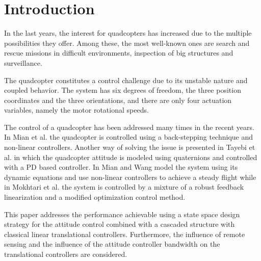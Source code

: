 \section{Introduction}
In the last years, the interest for quadcopters has increased due to the multiple possibilities they offer. Among these, the most well-known ones are search and rescue missions in difficult environments, inspection of big structures and surveillance. \nolinebreak\cite{droneuses}

The quadcopter constitutes a control challenge due to its unstable nature and coupled behavior. The system has six degrees of freedom, the three position coordinates and the three orientations, and there are only four actuation variables, namely the motor rotational speeds. \cite{draganflyer}%

The control of a quadcopter has been addressed many times in the recent years. In Mian et al. \cite{backstepping} the quadcopter is controlled using a back-stepping technique and non-linear controllers. Another way of solving the issue is presented in Tayebi et al. \cite{quaternionsPD} in which the quadcopter attitude is modeled using quaternions and controlled with a PD based controller. In \cite{MianWang} Mian and Wang model the system using its dynamic equations and use non-linear controllers to achieve a steady flight while in Mokhtari et al. \cite{GHinf} the system is controlled by a mixture of a robust feedback linearization and a modified optimization control method.

This paper addresses the performance achievable using a state space design strategy for the attitude control combined with a cascaded structure with classical linear translational controllers. Furthermore, the influence of remote sensing and the influence of the attitude controller bandwidth on the translational controllers are considered.
%


